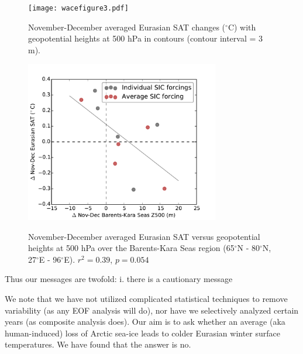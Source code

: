 \documentclass[grl]{AGUTeX}  %
\begin{document}
\begin{article}
\begin{figure}[t]
  \noindent\texttt{[image: wacefigure3.pdf]} \\ 
  \caption{November-December averaged Eurasian SAT changes ($^\circ$C) with geopotential heights at 500 hPa in contours (contour interval = 3 m).
}\label{fig:fig3}
\end{figure} %

\begin{figure}[t]
  \noindent\includegraphics[width=20pc,angle=0]{fig4.pdf} \\ 
  \caption{November-December averaged Eurasian SAT versus geopotential heights at 500 hPa over the Barents-Kara Seas region (65$^\circ$N - 80$^\circ$N, 27$^\circ$E - 96$^\circ$E). $r^2 = 0.39$, $p = 0.054$
}\label{fig:fig4}
\end{figure}


Thus our messages are twofold: i. there is a cautionary message 

We note that we have not utilized complicated statistical techniques to remove variability (as any EOF analysis will do), nor have we selectively analyzed certain years (as composite analysis does). Our aim is to ask whether an average (aka human-induced) loss of Arctic sea-ice leads to colder Eurasian winter surface temperatures. We have found that the answer is no.


\end{article}
\end{document}
